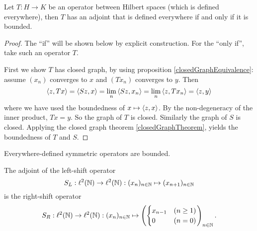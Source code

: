 \begin{theorem}
Let $T: H\to K$ be an operator between Hilbert spaces (which is defined everywhere), then $T$ has an adjoint that is defined everywhere \textup{if and only if} it is bounded.
\end{theorem}
\begin{proof}
The ``if'' will be shown below by explicit construction. For the ``only if'', take such an operator $T$.

First we show $T$ has closed graph, by using proposition \ref{closedGraphEquivalence}: assume $(x_n)$ converges to $x$ and $(Tx_n)$ converges to $y$. Then
\[ \left\langle z, Tx \right\rangle = \left\langle Sz,x \right\rangle = \lim_n\left\langle Sz, x_n \right\rangle = \lim_n\left\langle z, Tx_n \right\rangle = \left\langle z, y \right\rangle \]
where we have used the boundedness of $x\mapsto\left\langle z,x \right\rangle$. By the non-degeneracy of the inner product, $Tx = y$. So the graph of $T$ is closed. Similarly the graph of $S$ is closed. Applying the closed graph theorem \ref{closedGraphTheorem}, yields the boundedness of $T$ and $S$.
\end{proof}
\begin{corollary}
Everywhere-defined symmetric operators are bounded.
\end{corollary}

\begin{example}
The adjoint of the left-shift operator
\[ S_L: \ell^2(\mathbb{N}) \to \ell^2(\mathbb{N}): (x_n)_{n\in\mathbb{N}} \mapsto (x_{n+1})_{n\in\mathbb{N}} \]
is the right-shift operator
\[ S_R: \ell^2(\mathbb{N}) \to \ell^2(\mathbb{N}): (x_n)_{n\in\mathbb{N}} \mapsto \left(\begin{cases}
x_{n-1} & (n\geq 1) \\ 0 &(n=0)
\end{cases}\right)_{n\in \mathbb{N}}. \]
\end{example}

